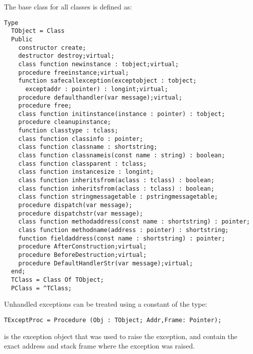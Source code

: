 The base class for all classes is defined as:
\begin{verbatim}
Type
  TObject = Class
  Public
    constructor create;
    destructor destroy;virtual;
    class function newinstance : tobject;virtual;
    procedure freeinstance;virtual;
    function safecallexception(exceptobject : tobject;
      exceptaddr : pointer) : longint;virtual;
    procedure defaulthandler(var message);virtual;
    procedure free;
    class function initinstance(instance : pointer) : tobject;
    procedure cleanupinstance;
    function classtype : tclass;
    class function classinfo : pointer;
    class function classname : shortstring;
    class function classnameis(const name : string) : boolean;
    class function classparent : tclass;
    class function instancesize : longint;
    class function inheritsfrom(aclass : tclass) : boolean;
    class function inheritsfrom(aclass : tclass) : boolean;
    class function stringmessagetable : pstringmessagetable;
    procedure dispatch(var message);
    procedure dispatchstr(var message);
    class function methodaddress(const name : shortstring) : pointer;
    class function methodname(address : pointer) : shortstring;
    function fieldaddress(const name : shortstring) : pointer;
    procedure AfterConstruction;virtual;
    procedure BeforeDestruction;virtual;
    procedure DefaultHandlerStr(var message);virtual;
  end;
  TClass = Class Of TObject;
  PClass = ^TClass;
\end{verbatim}
Unhandled exceptions can be treated using a constant of the
 type:
\begin{verbatim}
TExceptProc = Procedure (Obj : TObject; Addr,Frame: Pointer);
\end{verbatim}
 is the exception object that was used to raise the exception,
 and  contain the exact address and stack frame
where the exception was raised.

